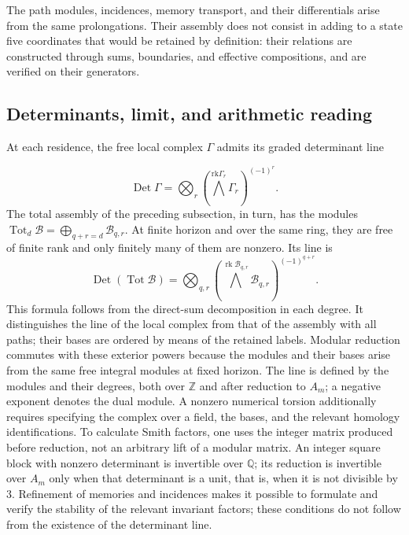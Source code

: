 The path modules, incidences, memory transport, and their differentials arise from the same prolongations. Their assembly does not consist in adding to a state five coordinates that would be retained by definition: their relations are constructed through sums, boundaries, and effective compositions, and are verified on their generators.

\subsection{Determinants, limit, and arithmetic reading}
At each residence, the free local complex \(\Gamma\) admits its graded determinant line

\[
\operatorname{Det}\Gamma=
\bigotimes_r\left(\bigwedge^{\mathrm{rk}\Gamma_r}\Gamma_r\right)^{(-1)^r}.
\]
The total assembly of the preceding subsection, in turn, has the modules \(\operatorname{Tot}_d\mathcal B=\bigoplus_{q+r=d}\mathcal B_{q,r}\). At finite horizon and over the same ring, they are free of finite rank and only finitely many of them are nonzero. Its line is
\[
\operatorname{Det}(\operatorname{Tot}\mathcal B)=
\bigotimes_{q,r}
\left(\bigwedge^{\operatorname{rk}\mathcal B_{q,r}}
\mathcal B_{q,r}\right)^{(-1)^{q+r}}.
\]
This formula follows from the direct-sum decomposition in each degree. It distinguishes the line of the local complex from that of the assembly with all paths; their bases are ordered by means of the retained labels. Modular reduction commutes with these exterior powers because the modules and their bases arise from the same free integral modules at fixed horizon.
The line is defined by the modules and their degrees, both over \(\mathbb Z\) and after reduction to \(A_m\); a negative exponent denotes the dual module. A nonzero numerical torsion additionally requires specifying the complex over a field, the bases, and the relevant homology identifications. To calculate Smith factors, one uses the integer matrix produced before reduction, not an arbitrary lift of a modular matrix. An integer square block with nonzero determinant is invertible over \(\mathbb Q\); its reduction is invertible over \(A_m\) only when that determinant is a unit, that is, when it is not divisible by \(3\). Refinement of memories and incidences makes it possible to formulate and verify the stability of the relevant invariant factors; these conditions do not follow from the existence of the determinant line.


